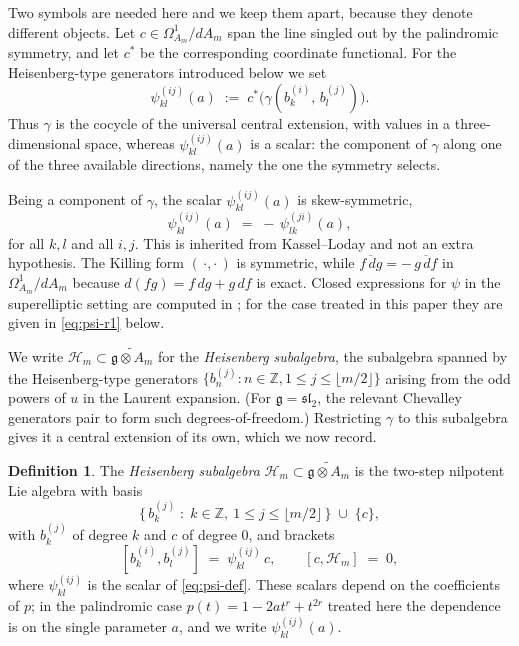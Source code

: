 \documentclass[12pt]{amsart}
\theoremstyle{plain}
\theoremstyle{definition}
\newtheorem{definition}[theorem]{Definition}
\newcommand{\ZZ}{\mathbb{Z}}
\newcommand{\fg}{\mathfrak{g}}
\newcommand{\Hm}{{\mathcal{H}_m}}     %
\begin{document}
Two symbols are needed here and we keep them apart, because they denote
different objects. Let $c \in \Omega^1_{A_m}/dA_m$ span the line singled
out by the palindromic symmetry, and let $c^{*}$ be the corresponding
coordinate functional. For the Heisenberg-type generators introduced
below we set
\begin{equation}\label{eq:psi-def}
  \psi^{(ij)}_{kl}(a)
  \;:=\;
  c^{*}\bigl(\gamma(b^{(i)}_{k},\, b^{(j)}_{l})\bigr).
\end{equation}
Thus $\gamma$ is the cocycle of the universal central extension, with
values in a three-dimensional space, whereas $\psi^{(ij)}_{kl}(a)$ is a
scalar: the component of $\gamma$ along one of the three available
directions, namely the one the symmetry selects.

Being a component of $\gamma$, the scalar $\psi^{(ij)}_{kl}(a)$ is
skew-symmetric,
\begin{equation}\label{eq:psi-skew}
  \psi^{(ij)}_{kl}(a) \;=\; -\,\psi^{(ji)}_{lk}(a),
\end{equation}
for all $k,l$ and all $i,j$. This is inherited from Kassel--Loday and
not an extra hypothesis. The Killing form $(\,\cdot,\cdot\,)$ is
symmetric, while $\overline{f\,dg} = -\,\overline{g\,df}$ in
$\Omega^1_{A_m}/dA_m$ because $d(fg) = f\,dg + g\,df$ is exact. Closed
expressions for $\psi$ in the superelliptic setting are computed in
\cite{SantosNeklyudovFutorny2025}; for the case treated in this paper
they are given in \eqref{eq:psi-r1} below.

We write $\Hm \subset \widetilde{\fg \otimes A_m}$ for the
\emph{Heisenberg subalgebra}, the subalgebra spanned by the
Heisenberg-type generators
$\{b_n^{(j)} : n \in \ZZ, 1 \leq j \leq \lfloor m/2 \rfloor\}$ arising from
the odd powers of $u$ in the Laurent expansion. (For $\fg = \mathfrak{sl}_2$,
the relevant Chevalley generators pair to form such degrees-of-freedom.)
Restricting $\gamma$ to this subalgebra gives it a central extension of
its own, which we now record.

\begin{definition}
\label{def:Hm}
The \emph{Heisenberg subalgebra} $\Hm \subset \widetilde{\fg \otimes A_m}$
is the two-step nilpotent Lie algebra with basis
\[
  \bigl\{\, b_k^{(j)} \;:\; k \in \ZZ,\ 1 \leq j \leq \lfloor m/2 \rfloor \,\bigr\}
  \;\cup\; \{c\},
\]
with $b_k^{(j)}$ of degree $k$ and $c$ of degree $0$, and brackets
\[
  [b_k^{(i)}, b_l^{(j)}] \;=\; \psi_{kl}^{(ij)}\, c,
  \qquad [c, \Hm] \;=\; 0 ,
\]
where $\psi_{kl}^{(ij)}$ is the scalar of \eqref{eq:psi-def}. These
scalars depend on the coefficients of $p$; in the palindromic case
$p(t) = 1 - 2at^r + t^{2r}$ treated here the dependence is on the single
parameter $a$, and we write $\psi_{kl}^{(ij)}(a)$.
\end{definition}
\end{document}
